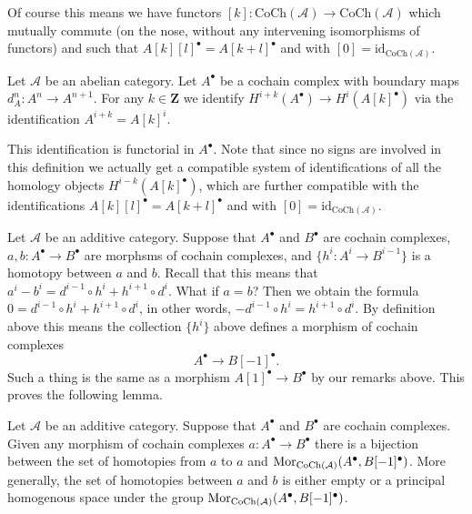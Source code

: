 \noindent
Of course this means we have functors
$[k] : \text{CoCh}(\mathcal{A}) \to \text{CoCh}(\mathcal{A})$
which mutually commute (on the nose, without
any intervening isomorphisms of functors) and
such that $A[k][l]^\bullet = A[k + l]^\bullet$ and
with $[0] = \text{id}_{\text{CoCh}(\mathcal{A})}$.

\begin{definition}
\label{definition-comology-shift}
Let $\mathcal{A}$ be an abelian category.
Let $A^\bullet$ be a cochain complex
with boundary maps $d_A^n : A^n \to A^{n + 1}$.
For any $k \in \mathbf{Z}$ we identify
{\it $H^{i + k}(A^\bullet) \longrightarrow H^i(A[k]^\bullet)$}
via the identification $A^{i + k} = A[k]^i$.
\end{definition}

\noindent
This identification is functorial in $A^\bullet$.
Note that since no signs are involved in this
definition we actually get a compatible system
of identifications of all the homology
objects $H^{i - k}(A[k]^\bullet)$, which are
further compatible with the identifications
$A[k][l]^\bullet = A[k + l]^\bullet$ and
with $[0] = \text{id}_{\text{CoCh}(\mathcal{A})}$.

\medskip\noindent
Let $\mathcal{A}$ be an additive category.
Suppose that $A^\bullet$ and $B^\bullet$ are
cochain complexes, $a, b : A^\bullet \to B^\bullet$ are
morphsms of cochain complexes, and $\{h^i : A^i \to B^{i - 1}\}$
is a homotopy between $a$ and $b$. Recall that this means
that
$a^i - b^i = d^{i - 1} \circ h^i + h^{i + 1} \circ d^i$.
What if $a = b$? Then we obtain the formula
$0 = d^{i - 1} \circ h^i + h^{i + 1} \circ d^i$,
in other words, $ - d^{i - 1} \circ h^i = h^{i + 1} \circ d^i$.
By definition above this means the collection $\{h^i\}$
above defines a morphism of cochain complexes
$$
A^\bullet \longrightarrow B[-1]^\bullet.
$$
Such a thing is the same as a morphism $A[1]^\bullet \to B^\bullet$
by our remarks above. This proves the following lemma.

\begin{lemma}
\label{lemma-homotopy-shift-cochain}
Let $\mathcal{A}$ be an additive category.
Suppose that $A^\bullet$ and $B^\bullet$ are
cochain complexes. Given any morphism of cochain
complexes $a : A^\bullet \to B^\bullet$ there
is a bijection between the set of homotopies
from $a$ to $a$ and
$\mathop{\rm Mor}\nolimits_{\text{CoCh}(\mathcal{A})}(A^\bullet, B[-1]^\bullet)$.
More generally, the set of homotopies between
$a$ and $b$ is either empty or a principal homogenous
space under the group
$\mathop{\rm Mor}\nolimits_{\text{CoCh}(\mathcal{A})}(A^\bullet, B[-1]^\bullet)$.
\end{lemma}

